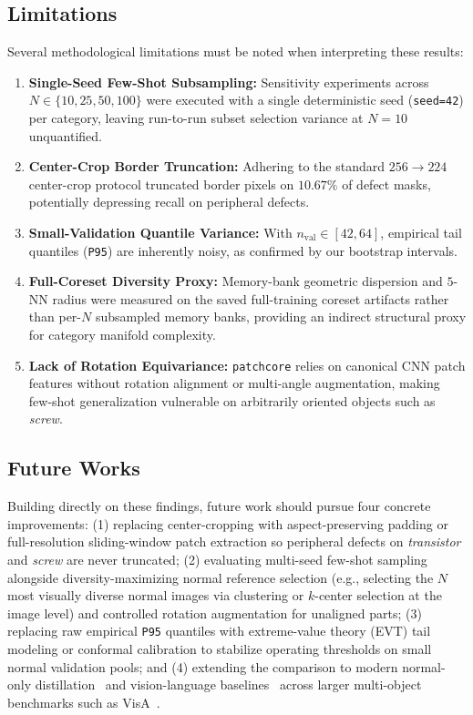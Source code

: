 \documentclass[conference]{IEEEtran}
\begin{document}
\subsection{Limitations}
Several methodological limitations must be noted when interpreting these results:
\begin{enumerate}
    \item \textbf{Single-Seed Few-Shot Subsampling:} Sensitivity experiments across $N \in \{10, 25, 50, 100\}$ were executed with a single deterministic seed (\texttt{seed=42}) per category, leaving run-to-run subset selection variance at $N=10$ unquantified.
    \item \textbf{Center-Crop Border Truncation:} Adhering to the standard $256\rightarrow 224$ center-crop protocol truncated border pixels on $10.67\%$ of defect masks, potentially depressing recall on peripheral defects.
    \item \textbf{Small-Validation Quantile Variance:} With $n_{\text{val}} \in [42, 64]$, empirical tail quantiles (\texttt{P95}) are inherently noisy, as confirmed by our bootstrap intervals.
    \item \textbf{Full-Coreset Diversity Proxy:} Memory-bank geometric dispersion and $5$-NN radius were measured on the saved full-training coreset artifacts rather than per-$N$ subsampled memory banks, providing an indirect structural proxy for category manifold complexity.
    \item \textbf{Lack of Rotation Equivariance:} \texttt{patchcore} relies on canonical CNN patch features without rotation alignment or multi-angle augmentation, making few-shot generalization vulnerable on arbitrarily oriented objects such as \textit{screw}.
\end{enumerate}

\subsection{Future Works}
Building directly on these findings, future work should pursue four concrete improvements: (1) replacing center-cropping with aspect-preserving padding or full-resolution sliding-window patch extraction so peripheral defects on \textit{transistor} and \textit{screw} are never truncated; (2) evaluating multi-seed few-shot sampling alongside diversity-maximizing normal reference selection (e.g., selecting the $N$ most visually diverse normal images via clustering or $k$-center selection at the image level) and controlled rotation augmentation for unaligned parts; (3) replacing raw empirical \texttt{P95} quantiles with extreme-value theory (EVT) tail modeling or conformal calibration to stabilize operating thresholds on small normal validation pools; and (4) extending the comparison to modern normal-only distillation~\cite{deng2022anomaly} and vision-language baselines~\cite{jeong2023winclip} across larger multi-object benchmarks such as VisA~\cite{zou2022spot}.



\end{document}
